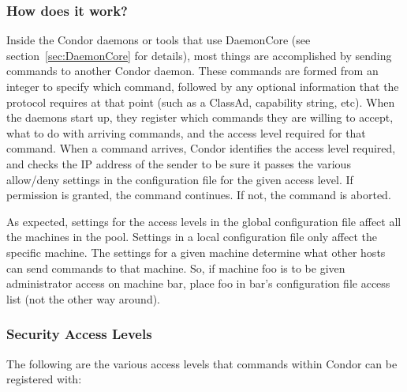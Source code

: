 \subsubsection{\label{sec:How-Host-Security-Works}How does it work?}

Inside the Condor daemons or tools that use DaemonCore (see
section~\ref{sec:DaemonCore} for details), most
things are accomplished by sending commands to another Condor daemon.
These commands are formed from an integer to specify which command,
followed
by any optional information that the protocol requires at that point
(such as a ClassAd, capability string, etc).
When the daemons start up,
they register which commands they are willing to accept, what to
do with arriving commands, and the access level required for
that command.
When a command arrives, Condor identifies the  access level
required, and checks the IP address of the sender to be
sure it passes the various allow/deny settings
in the configuration file for the given access level.
If permission is granted, the command continues. 
If not, the command is aborted.

As expected, settings for the access levels in the global
configuration file affect all the machines in the pool.
Settings in a local configuration file only affect the specific machine.
The settings for a given machine determine what other hosts can send
commands to that machine.
So, if machine foo is to be given 
administrator access on machine bar, place foo in
bar's configuration file access list (not the other way around).

\subsubsection{\label{sec:Security-Access-Levels}Security Access Levels} 

The following are the various access levels that commands within
Condor can be registered with:

